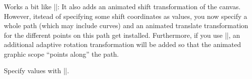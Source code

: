\begin{command}{\pgfsys@animatemotion}
  Works a bit like |\pgfsys@animation@translate|: It also adds an
  animated shift transformation of the canvas. However, itstead of
  specifying some shift coordinates as values, you now specify a whole
  path (which may include curves) and an animated translate
  transformation for the different points on this path get installed.
  Furthermore, if you use |\pgfsys@animation@rotatealong|, an
  additional adaptive rotation transformation will be added so that
  the animated graphic scope ``points along'' the path.
  
  Specify values with |\pgfsys@animation@movealong|.
\begin{codeexample}[width=2cm]
\end{codeexample}
\begin{codeexample}[width=2cm]
\end{codeexample}
\end{command}


